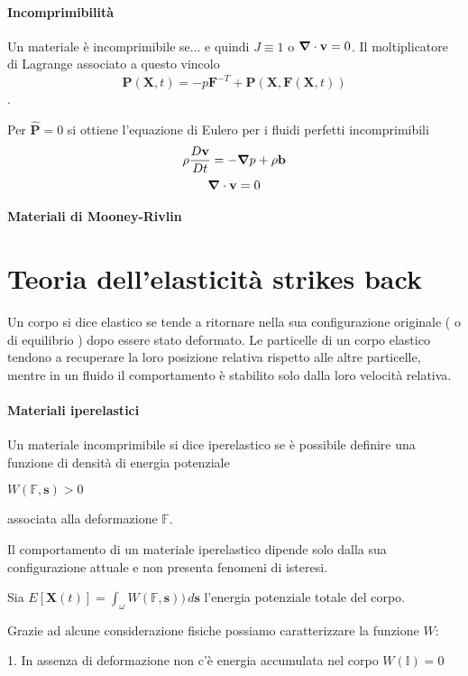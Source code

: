 \paragraph{Incomprimibilità}
Un materiale è incomprimibile se...
e quindi $J\equiv 1$ o $\boldsymbol{\nabla}\cdot\mathbf{v}=0$.
Il moltiplicatore di Lagrange associato a questo vincolo
$$\mathbf{P}(\mathbf{X},t)=-p\mathbf{F}^{-T}+\widehat{\mathbf{P}}(\mathbf{X},\mathbf{F}(\mathbf{X},t))$$.

Per $\widehat{\mathbf{P}}=0$  si ottiene l'equazione di Eulero per i fluidi perfetti incomprimibili
$$\rho\frac{D \mathbf{v}}{Dt} = -\boldsymbol{\nabla} p+\rho\mathbf{b}$$
$$\boldsymbol{\nabla}\cdot\mathbf{v}=0$$
\paragraph{Materiali di Mooney-Rivlin}


\section{Teoria dell'elasticità strikes back}

Un corpo si dice elastico se tende a ritornare nella sua configurazione originale ( o di equilibrio ) dopo essere stato deformato. Le particelle di un corpo elastico tendono a recuperare la loro posizione relativa rispetto alle altre particelle, mentre in un fluido il comportamento è stabilito solo dalla loro velocità relativa.

\paragraph{Materiali iperelastici}

Un materiale incomprimibile si dice iperelastico se è possibile definire una funzione di densità di energia potenziale

$W( \mathbb{F},\mathbf{s}) > 0$

associata alla deformazione $\mathbb{F}$.

Il comportamento di un materiale iperelastico dipende solo dalla sua configurazione attuale e non presenta fenomeni di isteresi.

Sia $E [  \mathbf{X}(t) ] = \int_{\omega} W( \mathbb{F}, \mathbf{s} )) \, d\mathbf{s}$ l'energia potenziale totale del corpo.

Grazie ad alcune considerazione fisiche possiamo caratterizzare la funzione $W$:

1. In assenza di deformazione non c'è energia accumulata nel corpo $W(\mathbb{I}) = 0$

